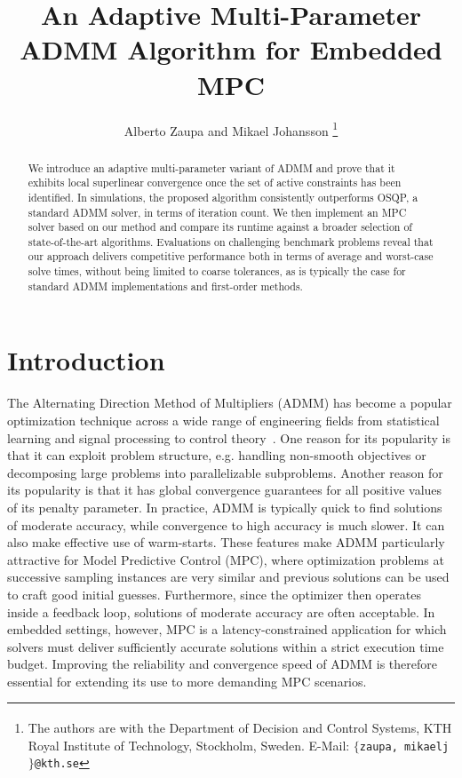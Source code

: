 \documentclass[letterpaper, 10 pt, conference]{ieeeconf}  %
\title{\LARGE \bf
An Adaptive Multi-Parameter ADMM Algorithm for Embedded MPC
}
\author{Alberto Zaupa\textsuperscript{\ddag} and Mikael Johansson\textsuperscript{\ddag}%
\thanks{\textsuperscript{\ddag} The authors are with 
the Department of Decision and Control Systems, KTH Royal Institute of Technology, Stockholm, Sweden. 
        E-Mail: {\tt\small $\{$zaupa, mikaelj$\}$@kth.se}
        }
}
\begin{document}
\maketitle
\thispagestyle{empty}
\pagestyle{empty}


\begin{abstract}
We introduce an adaptive multi-parameter variant of ADMM and prove that it exhibits local superlinear convergence once the set of active constraints has been identified. In simulations, the proposed algorithm consistently outperforms OSQP, a standard ADMM solver, in terms of iteration count. We then implement an MPC solver based on our method and compare its runtime against a broader selection of state-of-the-art algorithms. Evaluations on challenging benchmark problems reveal that our approach delivers competitive performance both in terms of average and worst-case solve times, without being limited to coarse tolerances, as is typically the case for standard ADMM implementations and first-order methods.
\end{abstract}


\section{Introduction}

The Alternating Direction Method of Multipliers (ADMM) has become a popular optimization technique across a wide range of engineering fields from statistical learning and signal processing to control theory~\cite{boyd_admm,sra,Stellato2020}. One reason for its popularity is that it can exploit problem structure, e.g. handling non-smooth objectives or decomposing large problems into parallelizable subproblems. 
Another reason for its popularity is that it has global convergence guarantees for all positive values of its penalty parameter. In practice, ADMM is typically quick to find solutions of moderate accuracy, while convergence to high accuracy is much slower. It can also make effective use of warm-starts. These features make ADMM particularly attractive for Model Predictive Control (MPC), where optimization problems at successive sampling instances are very similar and previous solutions can be used to craft good initial guesses. Furthermore, since the optimizer then operates inside a feedback loop, solutions of moderate accuracy are often acceptable. In embedded settings, however, MPC is a latency-constrained application for which solvers must deliver sufficiently accurate solutions within a strict execution time budget. Improving the reliability and convergence speed of ADMM is therefore essential for extending its use to more demanding MPC scenarios. 
\end{document}
